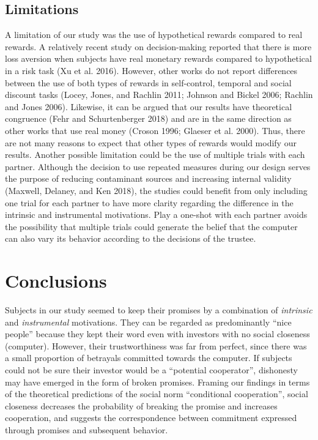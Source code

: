 \documentclass[smallextended]{svjour3}       %
\begin{document}
\hypertarget{limitations}{%
\subsection{Limitations}\label{limitations}}

A limitation of our study was the use of hypothetical rewards compared
to real rewards. A relatively recent study on decision-making reported
that there is more loss aversion when subjects have real monetary
rewards compared to hypothetical in a risk task (Xu et al. 2016).
However, other works do not report differences between the use of both
types of rewards in self-control, temporal and social discount tasks
(Locey, Jones, and Rachlin 2011; Johnson and Bickel 2006; Rachlin and
Jones 2006). Likewise, it can be argued that our results have
theoretical congruence (Fehr and Schurtenberger 2018) and are in the
same direction as other works that use real money (Croson 1996; Glaeser
et al. 2000). Thus, there are not many reasons to expect that other
types of rewards would modify our results. Another possible limitation
could be the use of multiple trials with each partner. Although the
decision to use repeated measures during our design serves the purpose
of reducing contaminant sources and increasing internal validity
(Maxwell, Delaney, and Ken 2018), the studies could benefit from only
including one trial for each partner to have more clarity regarding the
difference in the intrinsic and instrumental motivations. Play a
one-shot with each partner avoids the possibility that multiple trials
could generate the belief that the computer can also vary its behavior
according to the decisions of the trustee.

\hypertarget{conclusions}{%
\section{Conclusions}\label{conclusions}}

Subjects in our study seemed to keep their promises by a combination of
\emph{intrinsic} and \emph{instrumental} motivations. They can be
regarded as predominantly ``nice people'' because they kept their word
even with investors with no social closeness (computer). However, their
trustworthiness was far from perfect, since there was a small proportion
of betrayals committed towards the computer. If subjects could not be
sure their investor would be a ``potential cooperator'', dishonesty may
have emerged in the form of broken promises. Framing our findings in
terms of the theoretical predictions of the social norm ``conditional
cooperation'', social closeness decreases the probability of breaking
the promise and increases cooperation, and suggests the correspondence
between commitment expressed through promises and subsequent behavior.
\end{document}
